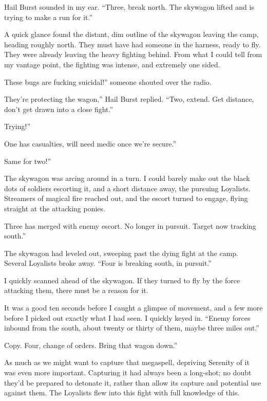 Hail Burst sounded in my ear. “Three, break north. The skywagon lifted and is trying to make a run for it.”

A quick glance found the distant, dim outline of the skywagon leaving the camp, heading roughly north. They must have had someone in the harness, ready to fly. They were already leaving the heavy fighting behind. From what I could tell from my vantage point, the fighting was intense, and extremely one sided.

\leavevmode{}These bugs are fucking suicidal!” someone shouted over the radio.

\leavevmode{}They’re protecting the wagon,” Hail Burst replied. “Two, extend. Get distance, don’t get drawn into a close fight.”

\leavevmode{}Trying!”

\leavevmode{}One has casualties, will need medic once we’re secure.”

\leavevmode{}Same for two!”

The skywagon was arcing around in a turn. I could barely make out the black dots of soldiers escorting it, and a short distance away, the pursuing Loyalists. Streamers of magical fire reached out, and the escort turned to engage, flying straight at the attacking ponies.

\leavevmode{}Three has merged with enemy escort. No longer in pursuit. Target now tracking south.”

The skywagon had leveled out, sweeping past the dying fight at the camp. Several Loyalists broke away. “Four is breaking south, in pursuit.”

I quickly scanned ahead of the skywagon. If they turned to fly by the force attacking them, there must be a reason for it.

It was a good ten seconds before I caught a glimpse of movement, and a few more before I picked out exactly what I had seen. I quickly keyed in. “Enemy forces inbound from the south, about twenty or thirty of them, maybe three miles out.”

\leavevmode{}Copy. Four, change of orders. Bring that wagon down.”

As much as we might want to capture that megaspell, depriving Serenity of it was even more important. Capturing it had always been a long-shot; no doubt they’d be prepared to detonate it, rather than allow its capture and potential use against them. The Loyalists flew into this fight with full knowledge of this.

